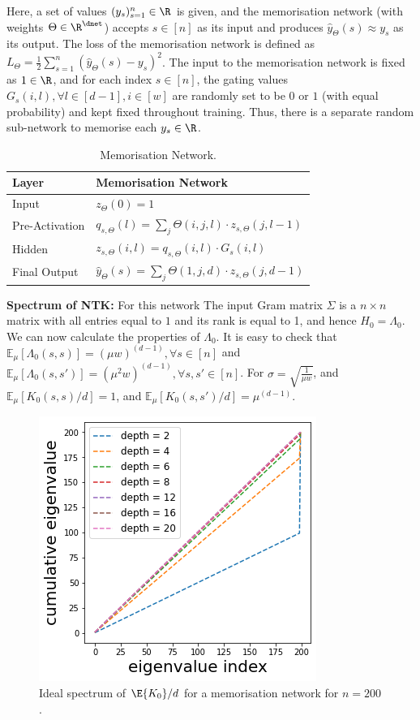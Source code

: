 Here, a set of values $(y_s)_{s=1}^n\in  \R$ is given, and the memorisation network (with weights $\Theta\in\R^{\dnet}$) accepts $s\in[n]$ as its input and produces $\hat{y}_{\Theta}(s)\approx y_s$ as its output. The loss of the memorisation network is defined as $L_{\Theta}=\frac{1}{2}\sum_{s=1}^n (\hat{y}_{\Theta}(s)-y_s)^2$.  The input to the memorisation network is fixed as $1\in\R$, and for each index $s\in[n]$, the gating values $G_{s}(i,l),\forall l\in[d-1], i\in[w] $ are randomly set to be $0$ or $1$ (with equal probability) and kept fixed throughout training. Thus, there is a separate random sub-network to memorise each $y_s\in\R$. 
\begin{table}%
\centering
\begin{tabular}{| l |  l  |}\hline
Layer&  Memorisation Network\\\hline
Input  &$z_{\Theta}(0)=1$ \\
Pre-Activation & $q_{s,\Theta}(l)=\sum_{j}\Theta(i,j,l)\cdot z_{s,\Theta}(j,l-1)$\\
Hidden & $z_{s,\Theta}(i,l)=q_{s,\Theta}(i,l)\cdot G_{s}(i,l)$ \\
Final  Output & $\hat{y}_{\Theta}(s)=\sum_{j} \Theta(1,j,d) \cdot z_{s,\Theta}(j,d-1)$\\\hline
\end{tabular}
\caption{ Memorisation Network.}
\label{tb:dgnmemo}
\end{table}
\textbf{Spectrum of NTK:} For this network 
The input Gram matrix $\Sigma$ is a $n\times n$ matrix with all entries equal to $1$ and its rank is equal to 1, and hence $H_0=\Lambda_0$. We can now calculate the properties of $\Lambda_0$. It is easy to check that $\mathbb{E}_{\mu}\left[\Lambda_0(s,s)\right]=(\mu w)^{(d-1)},\forall s\in[n]$ and $\mathbb{E}_{\mu}\left[\Lambda_0(s,s')\right]=(\mu^2 w)^{(d-1)},\forall s,s'\in[n]$.  For $\sigma=\sqrt{\frac{1}{\mu w}}$, and $\mathbb{E}_{\mu}\left[K_0(s,s)/d\right]=1$, and $\mathbb{E}_{\mu}\left[K_0(s,s')/d\right]=\mu^{(d-1)}$. 
\begin{figure}
\centering
\includegraphics[scale=0.3]{figs/dgn-fra-ecdf-ideal-small.png}
\caption{Ideal spectrum of $\E{K_0}/d$ for a memorisation network for $n=200$.}
\label{fig:ideal-spectrum}
\end{figure}


